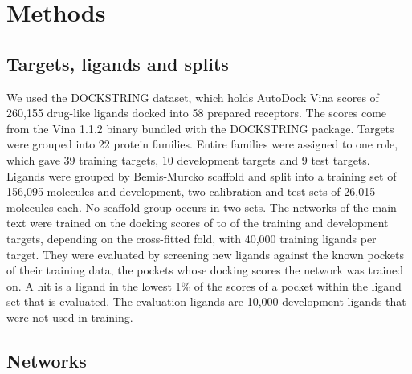 \section{Methods}

\subsection{Targets, ligands and splits}

We used the DOCKSTRING dataset, which holds AutoDock Vina scores of 260,155 drug-like ligands docked into 58 prepared receptors.\cite{dockstring,vina} The scores come from the Vina 1.1.2 binary bundled with the DOCKSTRING package.\cite{dockstringrepo} Targets were grouped into 22 protein families. Entire families were assigned to one role, which gave 39 training targets, 10 development targets and 9 test targets. Ligands were grouped by Bemis-Murcko scaffold\cite{bemis1996} and split into a training set of 156,095 molecules and development, two calibration and test sets of 26,015 molecules each. No scaffold group occurs in two sets. The networks of the main text were trained on the docking scores of \kfFoldTrainMin{} to \kfFoldTrainMax{} of the \kfNTargets{} training and development targets, depending on the cross-fitted fold, with 40{,}000 training ligands per target. They were evaluated by screening new ligands against the known pockets of their training data, the pockets whose docking scores the network was trained on. A hit is a ligand in the lowest 1\% of the scores of a pocket within the ligand set that is evaluated. The evaluation ligands are 10{,}000 development ligands that were not used in training.
\subsection{Networks}

